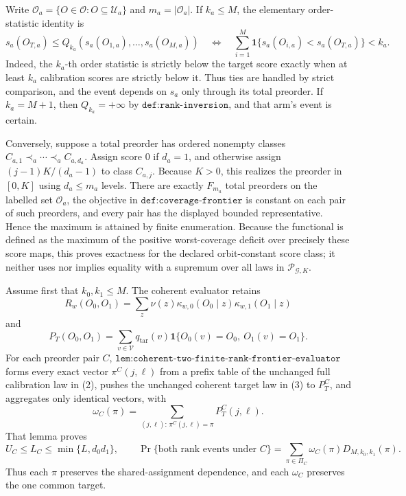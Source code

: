 Write \(\mathcal O_a=\{O\in\mathcal O:O\subseteq\mathcal U_a\}\) and \(m_a=|\mathcal O_a|\). If \(k_a\le M\), the elementary order-statistic identity is
\[
s_a(O_{T,a})\le Q_{k_a}(s_a(O_{1,a}),\ldots,s_a(O_{M,a}))
\quad\Longleftrightarrow\quad
\sum_{i=1}^M\mathbf 1\{s_a(O_{i,a})<s_a(O_{T,a})\}<k_a. \tag{1}
\]
Indeed, the \(k_a\)-th order statistic is strictly below the target score exactly when at least \(k_a\) calibration scores are strictly below it. Thus ties are handled by strict comparison, and the event depends on \(s_a\) only through its total preorder. If \(k_a=M+1\), then \(Q_{k_a}=+\infty\) by \(\texttt{def:rank-inversion}\), and that arm's event is certain.

Conversely, suppose a total preorder has ordered nonempty classes \(C_{a,1}\prec_a\cdots\prec_a C_{a,d_a}\). Assign score \(0\) if \(d_a=1\), and otherwise assign \((j-1)K/(d_a-1)\) to class \(C_{a,j}\). Because \(K>0\), this realizes the preorder in \([0,K]\) using \(d_a\le m_a\) levels. There are exactly \(F_{m_a}\) total preorders on the labelled set \(\mathcal O_a\), the objective in \(\texttt{def:coverage-frontier}\) is constant on each pair of such preorders, and every pair has the displayed bounded representative. Hence the maximum is attained by finite enumeration. Because the functional is defined as the maximum of the positive worst-coverage deficit over precisely these score maps, this proves exactness for the declared orbit-constant score class; it neither uses nor implies equality with a supremum over all laws in \(\mathcal P_{\mathcal G,K}\).

Assume first that \(k_0,k_1\le M\). The coherent evaluator retains
\[
R_w(O_0,O_1)=\sum_z\nu(z)\kappa_{w,0}(O_0\mid z)\kappa_{w,1}(O_1\mid z) \tag{2}
\]
and
\[
P_T(O_0,O_1)=\sum_{v\in\mathcal V}q_{\mathrm{tar}}(v)
\mathbf 1\{O_0(v)=O_0,\ O_1(v)=O_1\}. \tag{3}
\]
For each preorder pair \(C\), \(\texttt{lem:coherent-two-finite-rank-frontier-evaluator}\) forms every exact vector \(\pi^C(j,\ell)\) from a prefix table of the unchanged full calibration law in (2), pushes the unchanged coherent target law in (3) to \(P_T^C\), and aggregates only identical vectors, with
\[
\omega_C(\pi)=\sum_{(j,\ell):\,\pi^C(j,\ell)=\pi}P_T^C(j,\ell). \tag{4}
\]
That lemma proves
\[
U_C\le L_C\le\min\{L,d_0d_1\},\qquad
\Pr\{\text{both rank events under }C\}
=\sum_{\pi\in\Pi_C}\omega_C(\pi)D_{M,k_0,k_1}(\pi). \tag{5}
\]
Thus each \(\pi\) preserves the shared-assignment dependence, and each \(\omega_C\) preserves the one common target.

